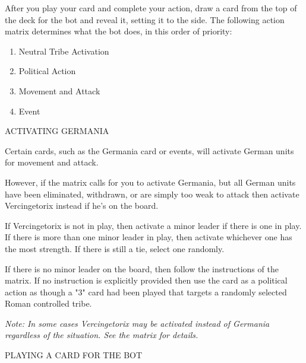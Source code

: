 After you play your card and complete your action, draw a card from the top of the deck for the bot and reveal it, setting it to the side. The following action matrix determines what the bot does, in this order of priority:

\begin{enumerate}
  \item Neutral Tribe Activation
  \item Political Action
  \item Movement and Attack
  \item Event
\end{enumerate}

ACTIVATING GERMANIA

Certain cards, such as the Germania card or events, will activate German units for movement and attack.

However, if the matrix calls for you to activate Germania, but all German units have been eliminated, withdrawn, or are simply too weak to attack then activate Vercingetorix instead if he's on the board.

If Vercingetorix is not in play, then activate a minor leader if there is one in play. If there is more than one minor leader in play, then activate whichever one has the most strength. If there is still a tie, select one randomly.

If there is no minor leader on the board, then follow the instructions of the matrix. If no instruction is explicitly provided then use the card as a political action as though a "3" card had been played that targets a randomly selected Roman controlled tribe.

\textit{Note: In some cases Vercingetorix may be activated instead of Germania regardless of the situation. See the matrix for details.}

\label{solitaire:playing_a_card_for_the_bot}PLAYING A CARD FOR THE BOT

